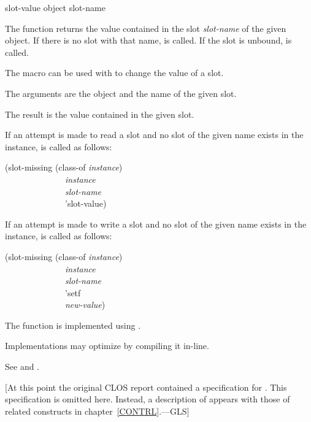 \begin{defun}[Function]
slot-value object slot-name

The function  returns the value contained in the slot
\emph{slot-name\/} of the given object.  If there is no slot with that
name,  is called.  If the slot is unbound,
 is called.

The macro  can be used with  to change the value
of a slot. 





The arguments are the object and the name of the given slot.


The result is the value contained in the given slot.


If an attempt is made to read a slot and no slot of the given name
exists in the instance,  is called as follows: 
\begin{lisp}
(slot-missing (class-of \emph{instance\/}) \\
~~~~~~~~~~~~~~\emph{instance} \\
~~~~~~~~~~~~~~\emph{slot-name\/} \\
~~~~~~~~~~~~~~'slot-value)
\end{lisp}

If an attempt is made to write a slot and no slot of the given name
exists in the instance,  is called as follows: 
\begin{lisp}
(slot-missing (class-of \emph{instance\/}) \\
~~~~~~~~~~~~~~\emph{instance} \\
~~~~~~~~~~~~~~\emph{slot-name\/} \\
~~~~~~~~~~~~~~'setf \\
~~~~~~~~~~~~~~\emph{new-value\/})
\end{lisp}

The function  is implemented using 
.

Implementations may optimize  by compiling it in-line.

See  and .
\end{defun}


[At this point the original CLOS report \cite{SIGPLAN-CLOS,LASC-CLOS-PART-2}
contained a specification for .
This specification is omitted here.  Instead, a description
of  appears with those of related constructs in chapter~\ref{CONTRL}.---GLS]


